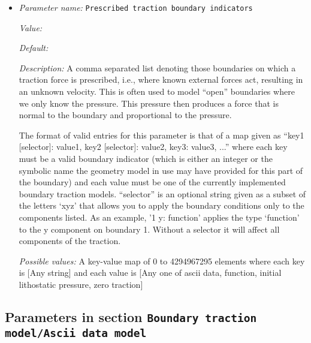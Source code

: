 \begin{itemize}
\item {\it Parameter name:} {\tt Prescribed traction boundary indicators}
\label{parameters:Boundary traction model/Prescribed traction boundary indicators}


{\it Value:} 


{\it Default:} 


{\it Description:} A comma separated list denoting those boundaries on which a traction force is prescribed, i.e., where known external forces act, resulting in an unknown velocity. This is often used to model ``open'' boundaries where we only know the pressure. This pressure then produces a force that is normal to the boundary and proportional to the pressure.

The format of valid entries for this parameter is that of a map given as ``key1 [selector]: value1, key2 [selector]: value2, key3: value3, ...'' where each key must be a valid boundary indicator (which is either an integer or the symbolic name the geometry model in use may have provided for this part of the boundary) and each value must be one of the currently implemented boundary traction models. ``selector'' is an optional string given as a subset of the letters `xyz' that allows you to apply the boundary conditions only to the components listed. As an example, '1 y: function' applies the type `function' to the y component on boundary 1. Without a selector it will affect all components of the traction.


{\it Possible values:} A key-value map of 0 to 4294967295 elements  where each key is [Any string] and each value is [Any one of ascii data, function, initial lithostatic pressure, zero traction]
\end{itemize}



\subsection{Parameters in section \tt Boundary traction model/Ascii data model}
\label{parameters:Boundary_20traction_20model/Ascii_20data_20model}


